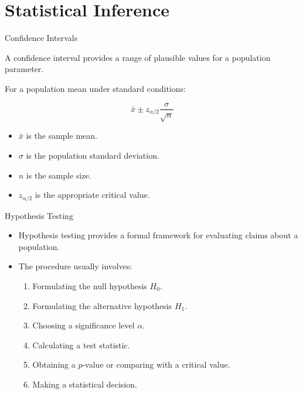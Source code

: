 \documentclass{beamer}
\begin{document}

\section{Statistical Inference}

\begin{frame}{Confidence Intervals}

A confidence interval provides a range of plausible values for a population parameter.

\vskip 0.5cm

For a population mean under standard conditions:

\[
\bar{x}
\pm
z_{\alpha/2}
\frac{\sigma}{\sqrt{n}}
\]

\vskip 0.5cm

\begin{itemize}

  \item $\bar{x}$ is the sample mean.

  \item $\sigma$ is the population standard deviation.

  \item $n$ is the sample size.

  \item $z_{\alpha/2}$ is the appropriate critical value.

\end{itemize}

\end{frame}


\begin{frame}{Hypothesis Testing}

\begin{itemize}

  \item Hypothesis testing provides a formal framework for evaluating claims about a population.

  \vskip 0.4cm

  \item The procedure usually involves:

  \begin{enumerate}
    \item Formulating the null hypothesis $H_0$.
    \item Formulating the alternative hypothesis $H_1$.
    \item Choosing a significance level $\alpha$.
    \item Calculating a test statistic.
    \item Obtaining a $p$-value or comparing with a critical value.
    \item Making a statistical decision.
  \end{enumerate}

\end{itemize}

\end{frame}
\end{document}
